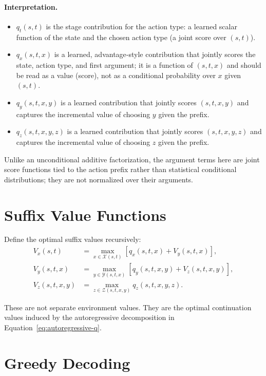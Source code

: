 \documentclass[11pt]{article}
\begin{document}
\paragraph{Interpretation.}
\begin{itemize}
  \item $q_t(s,t)$ is the stage contribution for the action type: a learned scalar function of the state and the chosen action type (a joint score over $(s,t)$).
  \item $q_x(s,t,x)$ is a learned, advantage‑style contribution that jointly scores the state, action type, and first argument; it is a function of $(s,t,x)$ and should be read as a value (score), not as a conditional probability over $x$ given $(s,t)$.
  \item $q_y(s,t,x,y)$ is a learned contribution that jointly scores $(s,t,x,y)$ and captures the incremental value of choosing $y$ given the prefix.
  \item $q_z(s,t,x,y,z)$ is a learned contribution that jointly scores $(s,t,x,y,z)$ and captures the incremental value of choosing $z$ given the prefix.
\end{itemize}

Unlike an unconditional additive factorization, the argument terms here are joint score functions tied to the action prefix rather than statistical conditional distributions; they are not normalized over their arguments.

\section{Suffix Value Functions}
\label{sec:suffix-values}

Define the optimal suffix values recursively:
\begin{align}
V_x(s,t)
&=
\max_{x \in \mathcal{X}(s,t)}
\left[
q_x(s,t,x) + V_y(s,t,x)
\right], \\
V_y(s,t,x)
&=
\max_{y \in \mathcal{Y}(s,t,x)}
\left[
q_y(s,t,x,y) + V_z(s,t,x,y)
\right], \\
V_z(s,t,x,y)
&=
\max_{z \in \mathcal{Z}(s,t,x,y)}
q_z(s,t,x,y,z).
\end{align}

These are not separate environment values. They are the optimal continuation values induced by the autoregressive decomposition in Equation~\eqref{eq:autoregressive-q}.

\section{Greedy Decoding}
\label{sec:greedy-decoding}
\end{document}
